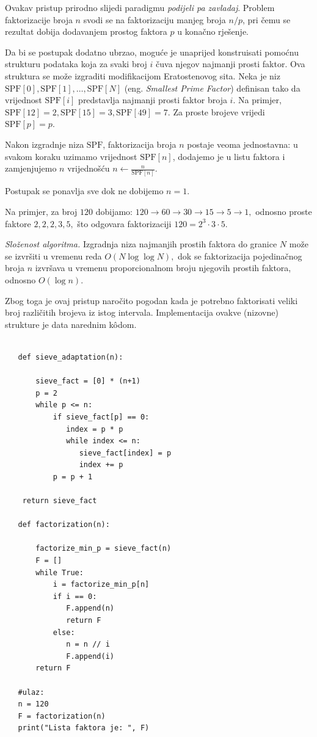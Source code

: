 \medskip

Ovakav pristup prirodno slijedi paradigmu \textit{podijeli pa zavladaj}. Problem faktorizacije broja $n$ svodi se na faktorizaciju manjeg broja $n/p$, pri čemu se rezultat dobija dodavanjem prostog faktora $p$ u konačno rješenje.

\medskip

Da bi se postupak dodatno ubrzao, moguće je unaprijed konstruisati pomoćnu strukturu podataka koja za svaki broj $i$ čuva njegov najmanji prosti faktor. Ova struktura se može izgraditi modifikacijom Eratostenovog sita. Neka je niz $
\textrm{SPF}[0], \textrm{SPF}[1], \ldots, \textrm{SPF}[N]$ (eng. \emph{Smallest Prime Factor}) definisan tako da vrijednost $\textrm{SPF}[i]$ predstavlja najmanji prosti faktor broja $i$. Na primjer, $
\textrm{SPF}[12]=2,
\textrm{SPF}[15]=3,
\textrm{SPF}[49]=7.$ Za proste brojeve vrijedi $ \textrm{SPF}[p]=p. $

Nakon izgradnje niza $\textrm{SPF}$, faktorizacija broja $n$ postaje veoma jednostavna: u svakom koraku uzimamo vrijednost $\textrm{SPF}[n]$, dodajemo je u listu faktora i zamjenjujemo $n$ vrijednošću $n \leftarrow \frac{n}{\textrm{SPF}[n]}.$

Postupak se ponavlja sve dok ne dobijemo $n=1$.

\medskip

Na primjer, za broj $120$ dobijamo: $
120 \rightarrow 60 \rightarrow 30 \rightarrow 15 \rightarrow 5 \rightarrow 1,$ odnosno proste faktore $2,2,2,3,5,$ što odgovara faktorizaciji $
120 = 2^3 \cdot 3 \cdot 5.$

\medskip

\textit{Složenost algoritma.} Izgradnja niza najmanjih prostih faktora do granice $N$ može se izvršiti u vremenu reda $O(N \log \log N),$  dok se faktorizacija pojedinačnog broja $n$ izvršava u vremenu proporcionalnom broju njegovih prostih faktora, odnosno $O(\log n).$

Zbog toga je ovaj pristup naročito pogodan kada je potrebno faktorisati veliki broj različitih brojeva iz istog intervala. Implementacija ovakve (nizovne) strukture je data narednim k\^odom. 
 
 \begin{verbatim}
 
   def sieve_adaptation(n):
   
       sieve_fact = [0] * (n+1)
       p = 2
       while p <= n:
           if sieve_fact[p] == 0:
       		  index = p * p
       		  while index <= n:
       			 sieve_fact[index] = p
       			 index += p
           p = p + 1
 	
	return sieve_fact
 	
   def factorization(n):
       
       factorize_min_p = sieve_fact(n)
       F = []
       while True: 
           i = factorize_min_p[n]
           if i == 0: 
              F.append(n)
              return F
           else:
              n = n // i
              F.append(i)
       return F  
   
   #ulaz: 
   n = 120
   F = factorization(n)
   print("Lista faktora je: ", F)
 \end{verbatim} 
 
